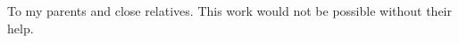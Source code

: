 \documentclass[twoside]{report}
\theoremstyle{definition}
\theoremstyle{remark}
\theoremstyle{remark}
\newcommand{\dedication}[1]
   {\thispagestyle{empty}

   \begin{flushleft}\raggedleft #1\end{flushleft}
}
\begin{document}
\sloppy



\newpage
\dedication{To my parents and close relatives. This work would not be possible without their help.}
\newpage

\setcounter{page}{5}

\newpage
\thispagestyle{empty}
\mbox{}
\newpage

\tableofcontents
\listoffigures

\newpage












\end{document}
